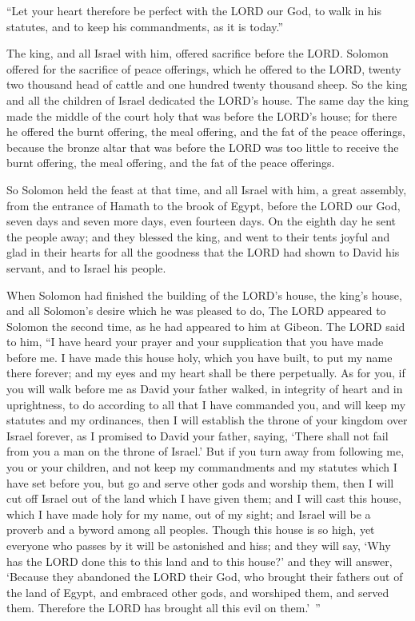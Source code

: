 \myverse{}“Let your heart therefore be perfect with the LORD our God, to
walk in his statutes, and to keep his commandments, as it is today.”

\myverse{}The king, and all Israel with him, offered sacrifice before the
LORD.
\myverse{}Solomon offered for the sacrifice of peace offerings, which he offered to
the LORD, twenty two thousand head of cattle and one hundred twenty thousand sheep. So the king and all
the children of Israel dedicated the LORD’s house.
\myverse{}The same day the king made the middle of the court holy that was before the
LORD’s house; for there he offered the burnt offering, the meal offering, and the fat of the peace offerings,
because the bronze altar that was before the LORD was too little to receive the burnt offering, the meal
offering, and the fat of the peace offerings.

\myverse{}So Solomon held the feast at that time, and all Israel with him,
a great assembly, from the entrance of Hamath to the brook of Egypt, before the LORD our God, seven days
and seven more days, even fourteen days.
\myverse{}On the eighth day he sent the people away; and they blessed the king, and
went to their tents joyful and glad in their hearts for all the goodness that the LORD had shown to David
his servant, and to Israel his people.


\mychapter{} \myverse*{}When Solomon had finished the building of the LORD’s house, the
king’s house, and all Solomon’s desire which he was pleased to do,
\myverse{}The LORD appeared to Solomon the second time, as he had appeared to him at Gibeon.
\myverse{}The LORD said to him, “I have heard your prayer and your supplication that you
have made before me. I have made this house holy, which you have built, to put my name there forever;
and my eyes and my heart shall be there perpetually.
\myverse{}As for you, if you will walk before me as David your father walked, in integrity
of heart and in uprightness, to do according to all that I have commanded you, and will keep my statutes
and my ordinances,
\myverse{}then I will establish the throne of your kingdom over Israel forever, as I promised
to David your father, saying, ‘There shall not fail from you a man on the throne of Israel.’
\myverse{}But if you turn away from following me, you or your children, and not keep my
commandments and my statutes which I have set before you, but go and serve other gods and worship them,
\myverse{}then I will cut off Israel out of the land which I have given them; and I will
cast this house, which I have made holy for my name, out of my sight; and Israel will be a proverb and
a byword among all peoples.
\myverse{}Though this house is so high, yet everyone who passes by it will be astonished
and hiss; and they will say, ‘Why has the LORD done this to this land and to this house?’
\myverse{}and they will answer, ‘Because they abandoned the LORD their God, who brought
their fathers out of the land of Egypt, and embraced other gods, and worshiped them, and served them.
Therefore the LORD has brought all this evil on them.’ ”

